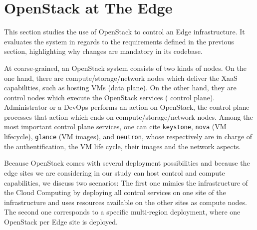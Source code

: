 \section{OpenStack at The Edge}
\label{sec:system_design_considerations}
%
This section studies the use of OpenStack to control an Edge
infrastructure.  It evaluates the system in regards to the
requirements defined in the previous section, highlighting why changes
are mandatory in its codebase.

At coarse-grained, an OpenStack system consists of two kinds of nodes. On the one hand,
there are compute/storage/network nodes which deliver the XaaS
capabilities, such as hosting VMs (\ie data plane). On the other hand,
they are control nodes which execute the OpenStack services (\ie
control plane).
%
Administrator or a DevOps performs an action on OpenStack, the control
plane processes that action which ends on compute/storage/network
nodes.
%
Among the most important control plane services, one can cite
\verb|keystone|, \verb|nova| (VM lifecycle), \verb|glance| (VM
images), and \verb|neutron|, whose respectively are in charge of the
authentification, the VM life cycle, their images and the network
aspects.

Because OpenStack comes with several deployment possibilities and
because the edge sites we are considering in our study can host
control and compute capabilities, we discuss two scenarios: The first
one mimics the infrastructure of the Cloud Computing by deploying all
control services on one site of the infrastructure and uses resources
available on the other sites as compute nodes.  The second one
corresponds to a specific multi-region deployment, where one OpenStack
per Edge site is deployed.

